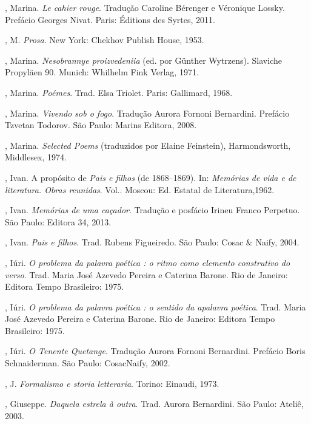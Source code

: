 , Marina. \emph{Le cahier rouge}. Tradução Caroline Bérenger e Véronique Lossky. Prefácio
Georges Nivat. Paris: Éditions des Syrtes, 2011.

, M. \emph{Prosa}. New York: Chekhov Publish House, 1953.

, Marina. \emph{Nesobrannye proizvedeniia} (ed. por Günther Wytrzens). Slaviche Propyläen 90. Munich: Whilhelm Fink Verlag, 1971.

, Marina. \emph{Poémes}. Trad. Elsa Triolet. Paris: Gallimard, 1968.

, Marina. \emph{Vivendo sob o fogo}. Tradução Aurora Fornoni Bernardini. Prefácio Tzvetan Todorov. São Paulo: Marins Editora, 2008.

, Marina. \emph{Selected Poems} (traduzidos por Elaine
Feinstein), Harmondsworth, Middlesex, 1974.

, Ivan. A propósito de \emph{Pais e filhos} (de 1868--1869). In: \emph{Memórias de vida e de literatura. Obras reunidas}. Vol.. Moscou: Ed. Estatal de Literatura,1962.

, Ivan. \emph{Memórias de uma caçador}. Tradução e posfácio Irineu Franco Perpetuo. São Paulo: Editora 34, 2013.

, Ivan. \emph{Pais e filhos}. Trad. Rubens Figueiredo. São
Paulo: Cosac \& Naify, 2004.

, Iúri. \emph{O problema da palavra poética : o ritmo como elemento
construtivo do verso}. Trad. Maria José Azevedo Pereira e Caterina
Barone. Rio de Janeiro: Editora Tempo Brasileiro: 1975.

, Iúri. \emph{O problema da palavra poética : o sentido da apalavra
poética}. Trad. Maria José Azevedo Pereira e Caterina Barone. Rio de
Janeiro: Editora Tempo Brasileiro: 1975.

, Iúri. \emph{O Tenente Quetange}. Tradução Aurora Fornoni Bernardini. Prefácio Boris Schnaiderman. São Paulo: CosacNaify, 2002.

, J. \emph{Formalismo e storia letteraria}. Torino: Einaudi, 1973.

, Giuseppe. \emph{Daquela estrela à outra}. Trad. Aurora Bernardini. São Paulo: Ateliê, 2003.

